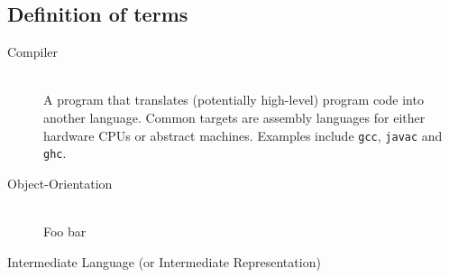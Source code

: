 
\subsection{Definition of terms}
\begin{description}
\item[Compiler] \hfill \\
  A program that translates (potentially high-level) program code into
  another language. Common targets are assembly languages for either
  hardware CPUs or abstract machines. Examples include
  \texttt{gcc}\cite{NEEDED}, \texttt{javac}\cite{NEEDED} and
  \texttt{ghc}\cite{NEEDED}.

\item[Object-Orientation] \hfill \\
  Foo bar

\item[Intermediate Language (or Intermediate Representation)] \hfill \\

\end{description}


\label{sec:spec}

